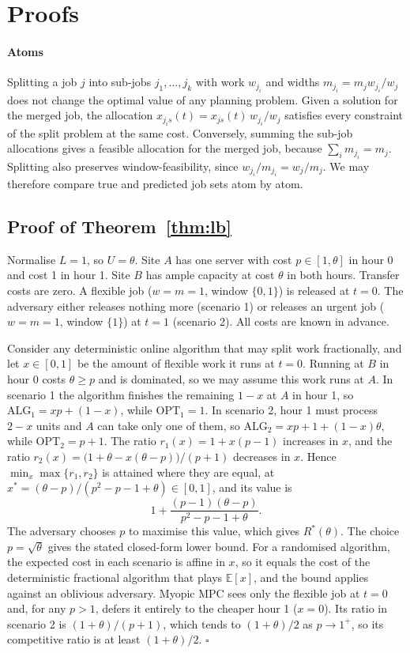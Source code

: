 \section{Proofs}\label{app:proofs}

\paragraph{Atoms} Splitting a job $j$ into sub-jobs $j_1,\dots,j_k$ with work $w_{j_i}$ and widths $m_{j_i}=m_jw_{j_i}/w_j$ does not change the optimal value of any planning problem. Given a solution for the merged job, the allocation $x_{j_i s}(t)=x_{js}(t)\,w_{j_i}/w_j$ satisfies every constraint of the split problem at the same cost. Conversely, summing the sub-job allocations gives a feasible allocation for the merged job, because $\sum_i m_{j_i}=m_j$. Splitting also preserves window-feasibility, since $w_{j_i}/m_{j_i}=w_j/m_j$. We may therefore compare true and predicted job sets atom by atom.

\subsection{Proof of Theorem~\ref{thm:lb}}

Normalise $L=1$, so $U=\theta$. Site $A$ has one server with cost $p\in[1,\theta]$ in hour 0 and cost 1 in hour 1. Site $B$ has ample capacity at cost $\theta$ in both hours. Transfer costs are zero. A flexible job ($w=m=1$, window $\{0,1\}$) is released at $t=0$. The adversary either releases nothing more (scenario 1) or releases an urgent job ($w=m=1$, window $\{1\}$) at $t=1$ (scenario 2). All costs are known in advance.

Consider any deterministic online algorithm that may split work fractionally, and let $x\in[0,1]$ be the amount of flexible work it runs at $t=0$. Running at $B$ in hour 0 costs $\theta\ge p$ and is dominated, so we may assume this work runs at $A$. In scenario 1 the algorithm finishes the remaining $1-x$ at $A$ in hour 1, so $\mathrm{ALG}_1=xp+(1-x)$, while $\mathrm{OPT}_1=1$. In scenario 2, hour 1 must process $2-x$ units and $A$ can take only one of them, so $\mathrm{ALG}_2=xp+1+(1-x)\theta$, while $\mathrm{OPT}_2=p+1$. The ratio $r_1(x)=1+x(p-1)$ increases in $x$, and the ratio $r_2(x)=\big(1+\theta-x(\theta-p)\big)/(p+1)$ decreases in $x$. Hence $\min_x\max\{r_1,r_2\}$ is attained where they are equal, at $x^*=(\theta-p)/(p^2-p-1+\theta)\in[0,1]$, and its value is
\[
1+\frac{(p-1)(\theta-p)}{p^2-p-1+\theta}.
\]
The adversary chooses $p$ to maximise this value, which gives $R^*(\theta)$. The choice $p=\sqrt\theta$ gives the stated closed-form lower bound. For a randomised algorithm, the expected cost in each scenario is affine in $x$, so it equals the cost of the deterministic fractional algorithm that plays $\mathbb{E}[x]$, and the bound applies against an oblivious adversary. Myopic MPC sees only the flexible job at $t=0$ and, for any $p>1$, defers it entirely to the cheaper hour 1 ($x=0$). Its ratio in scenario 2 is $(1+\theta)/(p+1)$, which tends to $(1+\theta)/2$ as $p\to 1^+$, so its competitive ratio is at least $(1+\theta)/2$. \hfill$\square$

